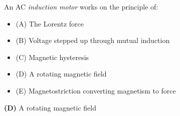 

An AC {\it induction motor} works on the principle of:

\begin{itemize}
\item{(A)} The Lorentz force
\vskip 5pt 
\item{(B)} Voltage stepped up through mutual induction
\vskip 5pt 
\item{(C)} Magnetic hysteresis
\vskip 5pt 
\item{(D)} A rotating magnetic field
\vskip 5pt 
\item{(E)} Magnetostriction converting magnetism to force
\end{itemize}







{\bf (D)} A rotating magnetic field











